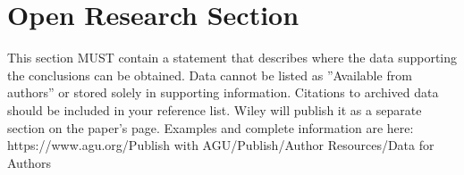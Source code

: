 \documentclass[draft]{agujournal2019}
\begin{document}


%
%

\section*{Open Research Section}
This section MUST contain a statement that describes where the data supporting the conclusions can be obtained. Data cannot be listed as ''Available from authors'' or stored solely in supporting information. Citations to archived data should be included in your reference list. Wiley will publish it as a separate section on the paper’s page. Examples and complete information are here:
https://www.agu.org/Publish with AGU/Publish/Author Resources/Data for Authors


%

\nocite{*}
%

%



%
%
%
%
%
\end{document}
